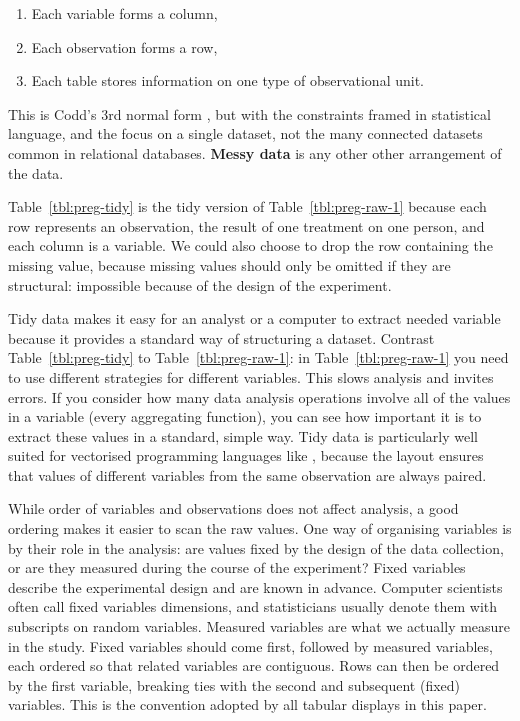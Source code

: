 \documentclass[article]{jss}
\begin{document}
\begin{enumerate}
  \item Each variable forms a column,
  \item Each observation forms a row,
  \item Each table stores information on one type of observational unit.
\end{enumerate}

\noindent This is Codd's 3rd normal form \citep{codd:1990}, but with the constraints framed in statistical language, and the focus on a single dataset, not the many connected datasets common in relational databases. \textbf{Messy data} is any other other arrangement of the data. 

Table~\ref{tbl:preg-tidy} is the tidy version of Table~\ref{tbl:preg-raw-1} because each row represents an observation, the result of one treatment on one person, and each column is a variable. We could also choose to drop the row containing the missing value, because missing values should only be omitted if they are structural: impossible because of the design of the experiment.

Tidy data makes it easy for an analyst or a computer to extract needed variable because it provides a standard way of structuring a dataset. Contrast Table~\ref{tbl:preg-tidy} to Table~\ref{tbl:preg-raw-1}: in Table~\ref{tbl:preg-raw-1} you need to use different strategies for different variables. This slows analysis and invites errors. If you consider how many data analysis operations involve all of the values in a variable (every aggregating function), you can see how important it is to extract these values in a standard, simple way. Tidy data is particularly well suited for vectorised programming languages like , because the layout ensures that values of different variables from the same observation are always paired.

While order of variables and observations does not affect analysis, a good ordering makes it easier to scan the raw values. One way of organising variables is by their role in the analysis: are values fixed by the design of the data collection, or are they measured during the course of the experiment? Fixed variables describe the experimental design and are known in advance. Computer scientists often call fixed variables dimensions, and statisticians usually denote them with subscripts on random variables. Measured variables are what we actually measure in the study. Fixed variables should come first, followed by measured variables, each ordered so that related variables are contiguous. Rows can then be ordered by the first variable, breaking ties with the second and subsequent (fixed) variables. This is the convention adopted by all tabular displays in this paper. 
\end{document}
